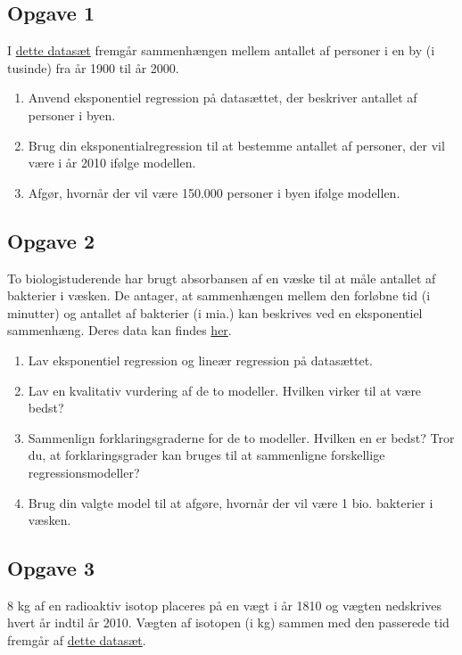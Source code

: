 \subsection*{Opgave 1}

I \href{https://github.com/ChristianJLex/TeachingNotes/raw/master/2022-2023/Data%20og%20lign/Befolkningsdata.xlsx}{\color{blue!60} dette datasæt} fremgår sammenhængen mellem antallet af personer i en by (i tusinde) fra år 1900 til år 2000.

\begin{enumerate}[label=\roman*)]
	\item Anvend eksponentiel regression på datasættet, der beskriver antallet af personer i byen.
	\item Brug din eksponentialregression til at bestemme antallet af personer, der vil være i år 2010 ifølge modellen.
	\item Afgør, hvornår der vil være 150.000 personer i byen ifølge modellen. 
\end{enumerate}


\subsection*{Opgave 2}
To biologistuderende har brugt absorbansen af en væske til at måle antallet af bakterier i væsken. De antager, at sammenhængen mellem den forløbne tid (i minutter) og antallet af bakterier (i mia.) kan beskrives ved en eksponentiel sammenhæng. Deres data kan findes \href{https://github.com/ChristianJLex/TeachingNotes/raw/master/2022-2023/Data%20og%20lign/Bakteriedata.xlsx}{\color{blue!60} her}.

\begin{enumerate}[label=\roman*)]
	\item Lav eksponentiel regression og lineær regression på datasættet.
	\item Lav en kvalitativ vurdering af de to modeller. Hvilken virker til at være bedst?
	\item Sammenlign forklaringsgraderne for de to modeller. Hvilken en er bedst? Tror du, at forklaringsgrader kan bruges til at sammenligne forskellige regressionsmodeller?
	\item Brug din valgte model til at afgøre, hvornår der vil være 1 bio. bakterier i væsken. 
\end{enumerate}

\subsection*{Opgave 3}
8 kg af en radioaktiv isotop placeres på en vægt i år 1810 og vægten nedskrives hvert år indtil år 2010. Vægten af isotopen (i kg) sammen med den passerede tid fremgår af \href{https://github.com/ChristianJLex/TeachingNotes/raw/master/2022-2023/Data%20og%20lign/Isotopdata.xlsx}{\color{blue!60} dette datasæt}.


